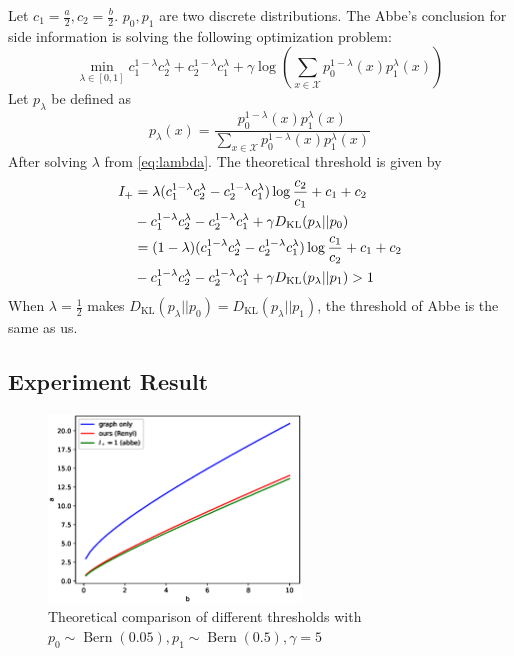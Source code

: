 \documentclass{article}
\DeclareMathOperator{\Bern}{Bern}
\begin{document}
Let $c_1 = \frac{a}{2}, c_2=\frac{b}{2}$. $p_0, p_1$ are two
discrete distributions.
The Abbe's conclusion for side information is solving the following
optimization problem:
\begin{equation}\label{eq:lambda}
    \min_{\lambda \in [0,1]} c_1^{1-\lambda}c_2^{\lambda} +
    c_2^{1-\lambda}c_1^{\lambda} + \gamma \log(\sum_{x\in \mathcal{X}}p^{1-\lambda}_0(x) p^{\lambda}_1(x))
\end{equation}
Let $p_{\lambda}$ be defined as
$$
p_{\lambda}(x) = \frac{p_0^{1-\lambda}(x) p_1^{\lambda} (x)}
{\sum_{x \in \mathcal{X}}p_0^{1-\lambda}(x) p_1^{\lambda} (x)}
$$
After solving $\lambda$ from \eqref{eq:lambda}. The theoretical
threshold is given by
\begin{align}
    I_+ &=\lambda (c_1^{1-\lambda}c_2^{\lambda} -
    c_2^{1-\lambda}c_1^{\lambda})\log\frac{c_2}{c_1}+c_1+c_2\notag \\
    &-c_1^{1-\lambda}c_2^{\lambda} -
    c_2^{1-\lambda}c_1^{\lambda}+\gamma D_{\mathrm{KL}}(p_{\lambda}||p_0) \\
    &=(1-\lambda) (c_1^{1-\lambda}c_2^{\lambda} -
    c_2^{1-\lambda}c_1^{\lambda})\log\frac{c_1}{c_2}+c_1+c_2\notag \\
    &-c_1^{1-\lambda}c_2^{\lambda} -
    c_2^{1-\lambda}c_1^{\lambda}+\gamma D_{\mathrm{KL}}(p_{\lambda}||p_1)
    >1
\end{align}
When $\lambda=\frac{1}{2}$ makes $D_{\mathrm{KL}}(p_{\lambda}||p_0)=
D_{\mathrm{KL}}(p_{\lambda}||p_1)$, the threshold of Abbe is the same as
us.

\subsection{Experiment Result}
\begin{figure}
    \centering
    \includegraphics[width=0.6\textwidth]{comparison.eps}\caption{Theoretical comparison of different thresholds with $p_0 \sim \Bern(0.05), p_1\sim \Bern(0.5), \gamma=5$}
    \label{fig:my_label}
\end{figure}
\end{document}
